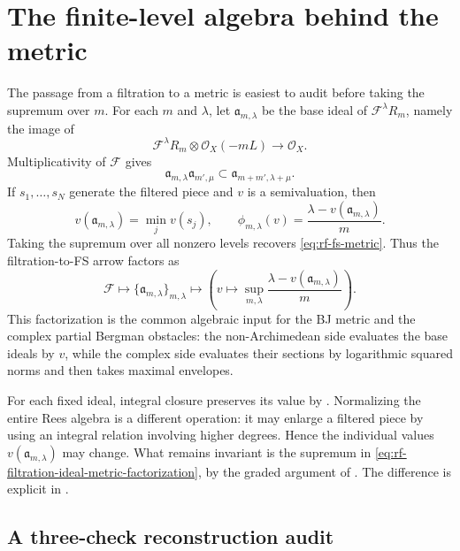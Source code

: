 \section{The finite-level algebra behind the metric}
\label{sec:rf-finite-level-algebra}

The passage from a filtration to a metric is easiest to audit before taking
the supremum over $m$.  For each $m$ and $\lambda$, let
$\mathfrak a_{m,\lambda}$ be the base ideal of
$\mathcal F^\lambda R_m$, namely the image of
\[
 \mathcal F^\lambda R_m\otimes\mathcal O_X(-mL)
                  \longrightarrow\mathcal O_X.
\tag{65.10}\label{eq:rf-filtered-base-ideal}
\]
Multiplicativity of $\mathcal F$ gives
\[
 \mathfrak a_{m,\lambda}\mathfrak a_{m',\mu}
       \subset
 \mathfrak a_{m+m',\lambda+\mu}.
\tag{65.11}\label{eq:rf-base-ideal-multiplicativity}
\]
If $s_1,\ldots,s_N$ generate the filtered piece and $v$ is a
semivaluation, then
\[
 v(\mathfrak a_{m,\lambda})
       =\min_jv(s_j),
 \qquad
 \phi_{m,\lambda}(v)
       =\frac{\lambda-v(\mathfrak a_{m,\lambda})}{m}.
\tag{65.12}\label{eq:rf-base-ideal-fs-level}
\]
Taking the supremum over all nonzero levels recovers
\eqref{eq:rf-fs-metric}.  Thus the filtration-to-FS arrow factors as
\[
 \mathcal F
 \longmapsto
 \{\mathfrak a_{m,\lambda}\}_{m,\lambda}
 \longmapsto
 \left(v\mapsto
   \sup_{m,\lambda}
   \frac{\lambda-v(\mathfrak a_{m,\lambda})}{m}\right).
\tag{65.13}\label{eq:rf-filtration-ideal-metric-factorization}
\]
This factorization is the common algebraic input for the BJ metric and the
complex partial Bergman obstacles: the non-Archimedean side evaluates the
base ideals by $v$, while the complex side evaluates their sections by
logarithmic squared norms and then takes maximal envelopes.

For each fixed ideal, integral closure preserves its value by . Normalizing the entire Rees algebra is a different operation: it may enlarge a filtered piece by using an integral relation involving higher degrees. Hence the individual values $v(\mathfrak a_{m,\lambda})$ may change. What remains invariant is the supremum in \eqref{eq:rf-filtration-ideal-metric-factorization}, by the graded argument of . The difference is explicit in .

\subsection{A three-check reconstruction audit}
\label{subsec:rf-reconstruction-audit}

